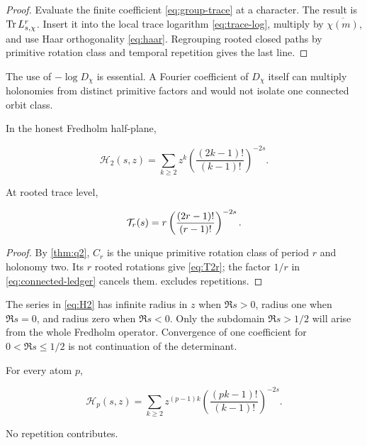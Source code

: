 \begin{proof}
Evaluate the finite coefficient \cref{eq:group-trace} at a character.  The
result is \(\operatorname{Tr} L_{s,\chi}^r\).  Insert it into the local trace logarithm
\cref{eq:trace-log}, multiply by \(\overline{\chi(m)}\), and use Haar
orthogonality \cref{eq:haar}.  Regrouping rooted closed paths by primitive
rotation class and temporal repetition gives the last line.
\end{proof}

The use of \(-\log D_\chi\) is essential.  A Fourier coefficient of
\(D_\chi\) itself can multiply holonomies from distinct primitive factors and
would not isolate one connected orbit class.

\begin{theorem}
\label{thm:h2}
In the honest Fredholm half-plane,

\begin{equation}
 \boxed{
 \mathcal H_2(s,z)=
 \sum_{k\ge2}z^k
 \left(\frac{(2k-1)!}{(k-1)!}\right)^{-2s}.}
\label{eq:H2}
\end{equation}

At rooted trace level,

\begin{equation}
 [2]\cT_r(s)=
 r\left(\frac{(2r-1)!}{(r-1)!}\right)^{-2s}.
\label{eq:T2r}
\end{equation}
\end{theorem}

\begin{proof}
By \cref{thm:q2}, \(C_r\) is the unique primitive rotation class of period
\(r\) and holonomy two.  Its \(r\) rooted rotations give
\cref{eq:T2r}; the factor \(1/r\) in \cref{eq:connected-ledger} cancels
them.   excludes repetitions.
\end{proof}

The series in \cref{eq:H2} has infinite radius in \(z\) when
\(\Re s>0\), radius one when \(\Re s=0\), and radius zero when
\(\Re s<0\).  Only the subdomain \(\Re s>1/2\) will arise from the whole
Fredholm operator.  Convergence of one coefficient for
\(0<\Re s\le1/2\) is not continuation of the determinant.

\begin{corollary}
\label{cor:Hp}
For every atom \(p\),

\begin{equation}
 \boxed{
 \mathcal H_p(s,z)=
 \sum_{k\ge2}z^{(p-1)k}
 \left(\frac{(pk-1)!}{(k-1)!}\right)^{-2s}.}
\label{eq:Hp}
\end{equation}

No repetition contributes.
\end{corollary}

